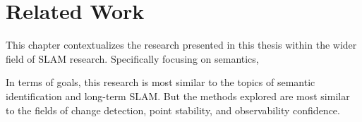 \section{Related Work}
\label{sec:related_work}

This chapter contextualizes the research presented in this thesis within the wider field of SLAM research. Specifically focusing on semantics, 

In terms of goals, this research is most similar to the topics of semantic identification and long-term SLAM. But the methods explored are most similar to the fields of change detection, point stability, and observability confidence.

% 